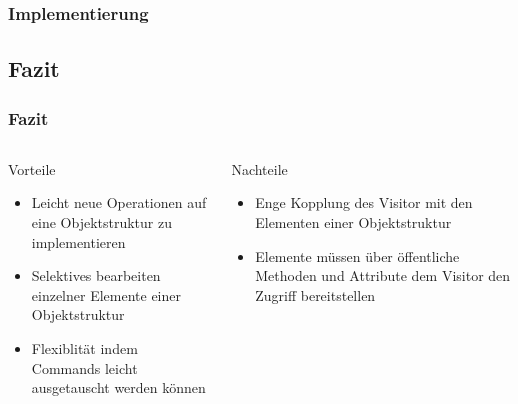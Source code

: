 \begin{frame}
	\frametitle{Implementierung}

\end{frame}

\subsection{Fazit}
\begin{frame}
	\frametitle{Fazit}
	\begin{columns} 
    		\begin{exampleblock}{Vorteile}
    			\begin{itemize}
    				\item Leicht neue Operationen auf eine Objektstruktur zu implementieren
    				\item Selektives bearbeiten einzelner Elemente einer Objektstruktur
    				\item Flexiblität indem Commands leicht ausgetauscht werden können
    			\end{itemize}
    		\end{exampleblock}
    		\begin{alertblock}{Nachteile}
    			\begin{itemize}
    				\item Enge Kopplung des Visitor mit den Elementen einer Objektstruktur
    				\item Elemente müssen über öffentliche Methoden und Attribute dem Visitor den Zugriff bereitstellen
    			\end{itemize}
    		\end{alertblock}
  	\end{columns}   	  		
\end{frame}